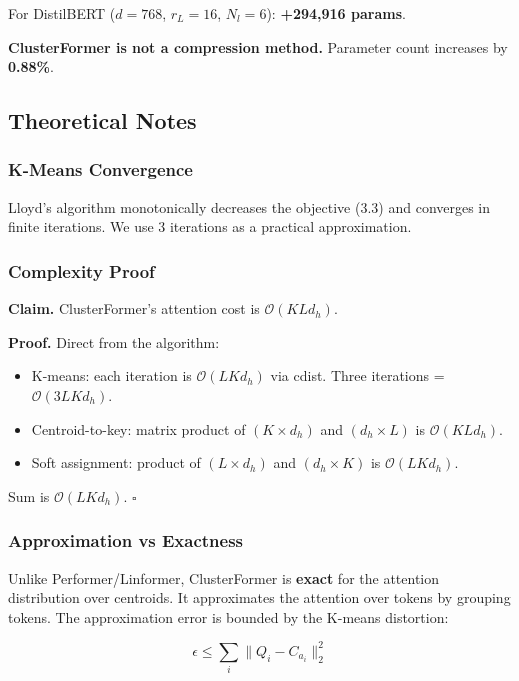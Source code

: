 For DistilBERT ($d=768$, $r_L=16$, $N_l=6$): \textbf{+294,916 params}.

\textbf{ClusterFormer is not a compression method.} Parameter count increases 
by \textbf{0.88\%}.

\subsection{Theoretical Notes}

\subsubsection{K-Means Convergence}

Lloyd's algorithm monotonically decreases the objective (3.3) and converges 
in finite iterations. We use 3 iterations as a practical approximation.

\subsubsection{Complexity Proof}

\textbf{Claim.} ClusterFormer's attention cost is $\mathcal{O}(K L d_h)$.

\textbf{Proof.} Direct from the algorithm:

\begin{itemize}
\item K-means: each iteration is $\mathcal{O}(L K d_h)$ via cdist. Three
  iterations = $\mathcal{O}(3 L K d_h)$.
\item Centroid-to-key: matrix product of $(K \times d_h)$ and $(d_h \times L)$
  is $\mathcal{O}(K L d_h)$.
\item Soft assignment: product of $(L \times d_h)$ and $(d_h \times K)$ is
  $\mathcal{O}(L K d_h)$.

\end{itemize}
Sum is $\mathcal{O}(L K d_h)$. $\square$

\subsubsection{Approximation vs Exactness}

Unlike Performer/Linformer, ClusterFormer is \textbf{exact} for the attention 
distribution over centroids. It approximates the attention over tokens by 
grouping tokens. The approximation error is bounded by the K-means 
distortion:

\begin{equation}
\epsilon \leq \sum_i \|Q_i - C_{a_i}\|_2^2
\end{equation}

